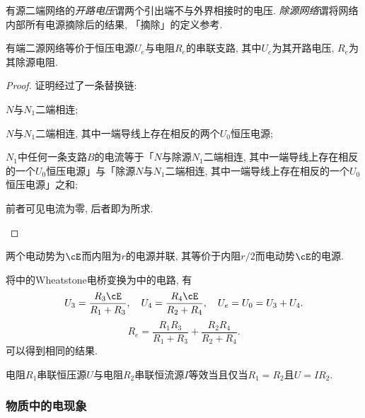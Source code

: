 \documentclass[../Electromagnetism.tex]{subfiles}
\begin{document}
有源二端网络的\emph{开路电压}谓两个引出端不与外界相接时的电压. \emph{除源网络}谓将网络内部所有电源摘除后的结果, 「摘除」的定义参考.
\begin{finale}
	\begin{theorem}[Thevenin定理]
		有端二源网络等价于恒压电源$U_e$与电阻$R_e$的串联支路, 其中$U_e$为其开路电压, $R_e$为其除源电阻.
	\end{theorem}
\end{finale}
\begin{proof}
	证明经过了一条替换链:
	\begin{cenum}
		\item $N$与$N_1$二端相连;
		\item $N$与$N_1$二端相连, 其中一端导线上存在相反的两个$U_0$恒压电源;
		\item $N_1$中任何一条支路$B$的电流等于「$N$与除源$N_1$二端相连, 其中一端导线上存在相反的一个$U_0$恒压电源」与「除源$N$与$N_1$二端相连, 其中一端导线上存在相反的一个$U_0$恒压电源」之和;
		\item 前者可见电流为零, 后者即为所求.\qedhere
	\end{cenum}
\end{proof}
\begin{ex}
	两个电动势为$\cE$而内阻为$r$的电源并联, 其等价于内阻$r/2$而电动势$\cE$的电源.
\end{ex}
\begin{ex}
	将中的Wheatstone电桥变换为中的电路, 有
	\[ U_3 = \frac{R_3 \cE}{R_1 + R_3},\quad U_4 = \frac{R_4 \cE}{R_2 + R_4}, \quad U_e = U_0 = U_3 + U_4. \]
	\[ R_e = \frac{R_1R_3}{R_1 + R_3} + \frac{R_2 R_4}{R_2 + R_4}. \]
	可以得到相同的结果.
\end{ex}
\begin{theorem}[恒流电源与恒压电源的等效]
	电阻$R_1$串联恒压源$U$与电阻$R_2$串联恒流源$I$等效当且仅当$R_1 = R_2$且$U = IR_2$.
\end{theorem}


\subsubsection{物质中的电现象} %
\label{ssub:物质中的电现象}
\end{document}
